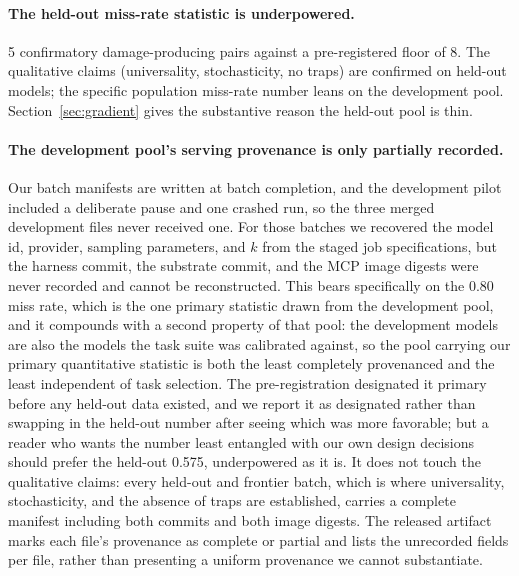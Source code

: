 \documentclass{article}
\begin{document}
\paragraph{The held-out miss-rate statistic is underpowered.} 5 confirmatory
damage-producing pairs against a pre-registered floor of 8. The qualitative
claims (universality, stochasticity, no traps) are confirmed on held-out models;
the specific population miss-rate number leans on the development pool.
Section~\ref{sec:gradient} gives the substantive reason the held-out pool is
thin.

\paragraph{The development pool's serving provenance is only partially recorded.}
Our batch manifests are written at batch completion, and the development pilot
included a deliberate pause and one crashed run, so the three merged development
files never received one. For those batches we recovered the model id, provider,
sampling parameters, and $k$ from the staged job specifications, but the harness
commit, the substrate commit, and the MCP image digests were never recorded and
cannot be reconstructed. This bears specifically on the 0.80 miss rate, which is
the one primary statistic drawn from the development pool, and it compounds with a
second property of that pool: the development models are also the models the task
suite was calibrated against, so the pool carrying our primary quantitative
statistic is both the least completely provenanced and the least independent of
task selection. The pre-registration designated it primary before any held-out
data existed, and we report it as designated rather than swapping in the held-out
number after seeing which was more favorable; but a reader who wants the number
least entangled with our own design decisions should prefer the held-out 0.575,
underpowered as it is. It does not touch the
qualitative claims: every held-out and frontier batch, which is where
universality, stochasticity, and the absence of traps are established, carries a
complete manifest including both commits and both image digests. The released
artifact marks each file's provenance as complete or partial and lists the
unrecorded fields per file, rather than presenting a uniform provenance we cannot
substantiate.
\end{document}
